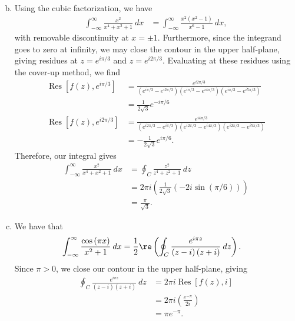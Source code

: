 \documentclass[10pt]{mypackage}
\DeclareMathOperator{\res}{Res}
\begin{document}
\begin{solution}[21.12]
\begin{enumerate}[(a)]
\begin{align*}
      \end{align*}
    \item Using the cubic factorization, we have
      \begin{align*}
        \int_{-\infty}^{\infty} \frac{x^2}{x^4 + x^2 + 1}\:dx &= \int_{-\infty}^{\infty} \frac{x^2\left( x^2 - 1 \right)}{x^6 - 1}\:dx,
      \end{align*}
      with removable discontinuity at $x = \pm 1$. Furthermore, since the integrand goes to zero at infinity, we may close the contour in the upper half-plane, giving residues at $z = e^{i\pi/3}$ and $z = e^{i2\pi/3}$. Evaluating at these residues using the cover-up method, we find
      \begin{align*}
        \res\left[ f(z),e^{i\pi/3} \right] &= \frac{e^{i2\pi/3}}{\left( e^{i\pi/3}-e^{i2\pi/3} \right)\left( e^{i\pi/3} - e^{i4\pi/3} \right) \left( e^{i\pi/3} -  e^{i5\pi/3}\right)}\\
                                           &= \frac{1}{2\sqrt{3}}e^{-i\pi/6}\\
        \res\left[ f(z),e^{i2\pi/3} \right] &= \frac{e^{i4\pi/3}}{\left( e^{i2\pi/3} - e^{i\pi/3} \right)\left( e^{i2\pi/3} - e^{i4\pi/3} \right)\left( e^{i2\pi/3} - e^{i5\pi/3} \right)}\\
                                            &= -\frac{1}{2\sqrt{3}}e^{i\pi/6}.
      \end{align*}
      Therefore, our integral gives
      \begin{align*}
        \int_{-\infty}^{\infty} \frac{x^2}{x^4 + x^2 + 1}\:dx &= \oint_{C}\frac{z^2}{z^4 + z^2 + 1}\:dz\\
                                                              &= 2\pi i \left( \frac{1}{2\sqrt{3}}\left( -2i\sin\left( \pi/6 \right) \right) \right)\\
                                                              &= \frac{\pi}{\sqrt{3}}.
      \end{align*}
    \item We have that
      \begin{align*}
        \int_{-\infty}^{\infty} \frac{\cos\left( \pi x \right)}{x^2 + 1}\:dx &= \frac{1}{2}\re\left( \oint_{C}\frac{e^{i\pi z}}{\left( z-i \right)\left( z+i \right)}\:dz \right).
      \end{align*}
      Since $\pi > 0$, we close our contour in the upper half-plane, giving
      \begin{align*}
        \oint_{C}\frac{e^{i\pi z}}{\left( z-i \right)\left( z+i \right)}\:dz &= 2\pi i\res\left[ f(z),i \right]\\
                                                                             &= 2\pi i \left( \frac{e^{-\pi}}{2i} \right)\\
                                                                             &= \pi e^{-\pi}.
      \end{align*}
  \end{enumerate}
\end{solution}
\end{document}
